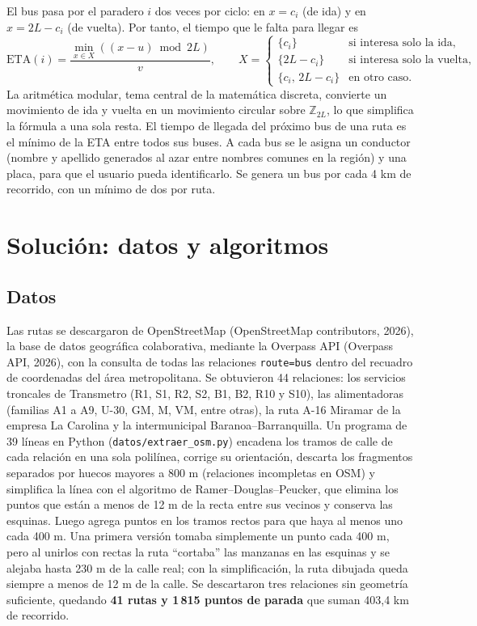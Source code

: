 \documentclass[12pt,letterpaper]{article}
\begin{document}
El bus pasa por el paradero $i$ dos veces por ciclo: en $x=c_i$ (de ida) y en $x=2L-c_i$ (de vuelta). Por tanto, el tiempo que le falta para llegar es
\[
\text{ETA}(i)=\frac{\min_{x\in X}\left((x-u)\bmod 2L\right)}{v},\qquad
X=\begin{cases}\{c_i\} & \text{si interesa solo la ida},\\ \{2L-c_i\} & \text{si interesa solo la vuelta},\\ \{c_i,\,2L-c_i\} & \text{en otro caso.}\end{cases}
\]
La aritmética modular, tema central de la matemática discreta, convierte un movimiento de ida y vuelta en un movimiento circular sobre $\mathbb{Z}_{2L}$, lo que simplifica la fórmula a una sola resta. El tiempo de llegada del próximo bus de una ruta es el mínimo de la ETA entre todos sus buses. A cada bus se le asigna un conductor (nombre y apellido generados al azar entre nombres comunes en la región) y una placa, para que el usuario pueda identificarlo. Se genera un bus por cada 4 km de recorrido, con un mínimo de dos por ruta.

\section{Solución: datos y algoritmos}

\subsection{Datos}
Las rutas se descargaron de OpenStreetMap (OpenStreetMap contributors, 2026), la base de datos geográfica colaborativa, mediante la Overpass API (Overpass API, 2026), con la consulta de todas las relaciones \texttt{route=bus} dentro del recuadro de coordenadas del área metropolitana. Se obtuvieron 44 relaciones: los servicios troncales de Transmetro (R1, S1, R2, S2, B1, B2, R10 y S10), las alimentadoras (familias A1 a A9, U-30, GM, M, VM, entre otras), la ruta A-16 Miramar de la empresa La Carolina y la intermunicipal Baranoa--Barranquilla. Un programa de 39 líneas en Python (\texttt{datos/extraer\_osm.py}) encadena los tramos de calle de cada relación en una sola polilínea, corrige su orientación, descarta los fragmentos separados por huecos mayores a 800 m (relaciones incompletas en OSM) y simplifica la línea con el algoritmo de Ramer--Douglas--Peucker, que elimina los puntos que están a menos de 12 m de la recta entre sus vecinos y conserva las esquinas. Luego agrega puntos en los tramos rectos para que haya al menos uno cada 400 m. Una primera versión tomaba simplemente un punto cada 400 m, pero al unirlos con rectas la ruta ``cortaba'' las manzanas en las esquinas y se alejaba hasta 230 m de la calle real; con la simplificación, la ruta dibujada queda siempre a menos de 12 m de la calle. Se descartaron tres relaciones sin geometría suficiente, quedando \textbf{41 rutas y 1\,815 puntos de parada} que suman 403,4 km de recorrido.
\end{document}
